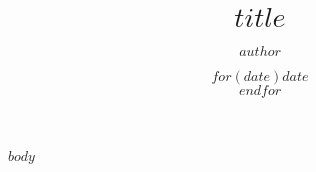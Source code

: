 
\providecommand{\tightlist}{}

\makeatletter
\def\labelenumi{第\theenumi 章　}
\def\theenumii{\arabic{enumii}}
\def\p@enumii{}
\def\labelenumii{第\theenumii 条　}
\def\theenumiii{\arabic{enumiii}}
\def\labelenumiii{\theenumiii　}
\def\p@enumiii{}
\def\hhspace{\hspace{10.8pt}}
\makeatother
\title{\Huge $title$}
\author{\huge $author$}
\date{\LARGE $for(date)$$date$\\$endfor$}

\maketitle
$body$

